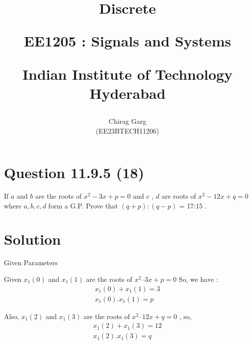 \documentclass[journal,12pt,twocolumn]{IEEEtran}
\theoremstyle{remark}
\begin{document}
%




\vspace{3cm}

\title{
Discrete

\large{EE1205 : Signals and Systems}

Indian Institute of Technology Hyderabad
}
\author{Chirag Garg

(EE23BTECH11206)
}	





\maketitle

\newpage



\bigskip

\renewcommand{\thefigure}{\arabic{figure}}
\renewcommand{\thetable}{\arabic{table}}


\section{Question 11.9.5 (18)}
\vspace{0.5cm}
\begin{flushleft}
If $a$ and $b$ are the roots of $x^{2} -3x + p = 0$ and $c$ , $d$ are roots of $x^{2} - 12x + q = 0$ where $a,b,c,d$ form a G.P. Prove that $(q+p) : (q-p)$ = 17:15 .
\end{flushleft}  


\vspace{0.8cm}


\section{Solution} 

\begin{table}[htbp]
\centering
\resizebox{\columnwidth}{!}{
}
\caption{ Given Parameters}

\end{table}

Given $x_1(0)$ and $x_1(1)$ are the roots of $x^{2} – 3x + p = 0$
So, we have :
\begin{align}
 x_1(0) + x_1(1) = 3\\
 x_1(0).x_1(1) = p 
\end{align}

Also, $x_1(2)$ and $x_1(3)$ are the roots of $x^{2} – 12x + q = 0$ , so,
\begin{align}
x_1(2) + x_1(3)= 12 \\
x_1(2).x_1(3) = q
 \end{align}  
\end{document}
